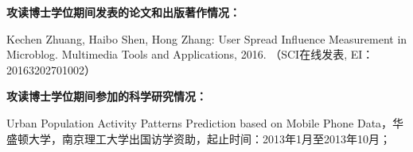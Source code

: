 \begin{appendix}

{\noindent\bf\songti{}攻读博士学位期间发表的论文和出版著作情况：}

\begin{compactenum}[1.][17]
	\item 
	Kechen Zhuang, Haibo Shen, Hong Zhang: 
	User Spread Influence Measurement in Microblog. Multimedia Tools and Applications, 2016.
	（SCI在线发表, EI：20163202701002） 
	
\end{compactenum}

\vspace{20pt}
{\noindent\bf\songti{}攻读博士学位期间参加的科学研究情况：}

\begin{compactenum}[1.][17]
\item
Urban Population Activity Patterns Prediction based on Mobile Phone Data，华盛顿大学，南京理工大学出国访学资助，起止时间：2013年1月至2013年10月；
\end{compactenum}

\end{appendix}

